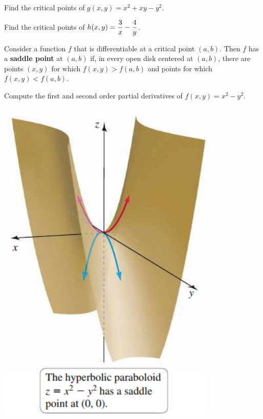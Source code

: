 \documentclass[../mathNotesPreamble]{subfiles}
\begin{document}
  \begin{ex*}
    Find the critical points of $g(x,y)=x^2+xy-y^2$.
  \end{ex*}

  \begin{ex*}
    Find the critical points of $\displaystyle h(x,y)=\frac{3}{x}-\frac{4}{y}$.
  \end{ex*}

  \pagebreak

  \begin{defn*}
    Consider a function $f$ that is differentiable at a critical point $(a,b)$. Then $f$ has a \textbf{saddle point} at $(a,b)$ if, in every open disk centered at $(a,b)$, there are points $(x,y)$ for which $f(x,y)>f(a,b)$ and points for which $f(x,y)<f(a,b)$.
  \end{defn*}

  \noindent
  \begin{minipage}[t]{0.65\linewidth}
    \begin{ex*}
      Compute the first and second order partial derivatives of $f(x,y)=x^2-y^2$.
    \end{ex*}
  \end{minipage}%
  \begin{minipage}[t]{0.35\linewidth}\mbox{}
    \begin{flushright}
      \includegraphics[width=0.8\linewidth]{../images/briggs_15_07/fig15_68}
    \end{flushright}
  \end{minipage}
\end{document}
